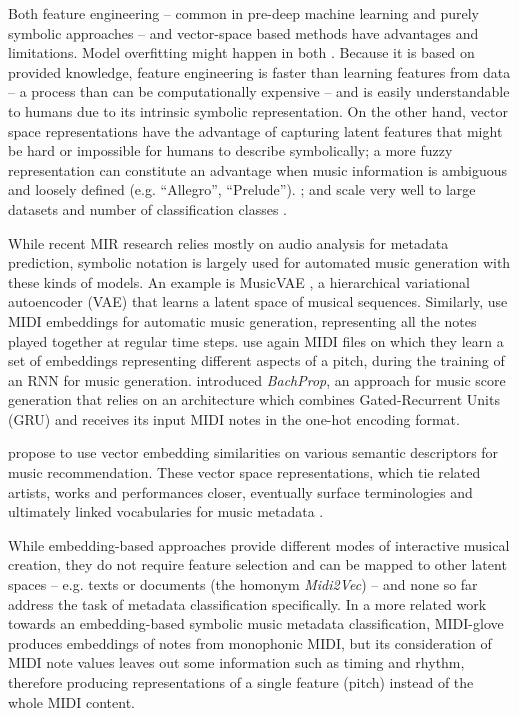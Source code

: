 \documentclass{article}
\begin{document}
Both feature engineering -- common in pre-deep machine learning and purely symbolic approaches -- and vector-space based methods have advantages and limitations. Model overfitting might happen in both \citep{guyon2003introduction,weng2019overfit}. Because it is based on provided knowledge, feature engineering is faster than learning features from data -- a process than can be computationally expensive -- and is easily understandable to humans due to its intrinsic symbolic representation. On the other hand, vector space representations have the advantage of capturing latent features that might be hard or impossible for humans to describe symbolically; a more fuzzy representation can constitute an advantage when music information is ambiguous and loosely defined (e.g. ``Allegro'', ``Prelude''). \citep{wilcke2017knowledge}; and scale very well to large datasets and number of classification classes \citep{mckay2010datasetslac}.

While recent MIR research relies mostly on audio analysis for metadata prediction, symbolic notation is largely used for automated music generation with these kinds of models. An example is MusicVAE \citep{roberts2018}, a hierarchical variational autoencoder (VAE) that learns a latent space of musical sequences. Similarly, \cite{huang2016deepmusic} use MIDI embeddings for automatic music generation, representing all the notes played together at regular time steps. \cite{yan2018part} use again MIDI files on which they learn a set of embeddings representing different aspects of a pitch, during the training of an RNN for music generation. \cite{colombo2019bachprop} introduced \textit{BachProp}, an approach for music score generation that relies on an architecture which combines Gated-Recurrent Units (GRU) and receives its input MIDI notes in the one-hot encoding format.

\cite{lisena2017artistsimilarity} propose to use vector embedding similarities on various semantic descriptors for music recommendation. These vector space representations, which tie related artists, works and performances closer, eventually surface terminologies and ultimately linked vocabularies for music metadata \citep{lisena2018vocabularies}.

While embedding-based approaches provide different modes of interactive musical creation, they do not require feature selection and can be mapped to other latent spaces -- e.g. texts \citep{vanderweerdt2018} or documents (the homonym \textit{Midi2Vec}) -- and none so far address the task of metadata classification specifically. In a more related work towards an embedding-based symbolic music metadata classification, MIDI-glove produces embeddings of notes from monophonic MIDI, but its consideration of MIDI note values leaves out some information such as timing and rhythm, therefore producing representations of a single feature (pitch) instead of the whole MIDI content.
\end{document}
